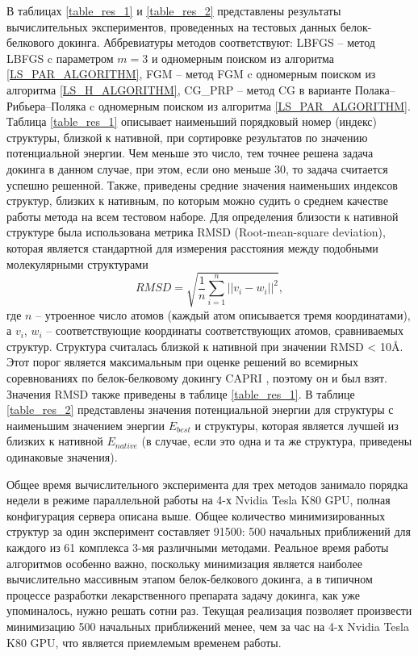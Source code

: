  В таблицах \ref{table_res_1} и \ref{table_res_2} представлены результаты вычислительных экспериментов, проведенных на тестовых данных белок-белкового докинга. Аббревиатуры методов соответствуют: LBFGS -- метод LBFGS c параметром $m = 3$ и одномерным поиском из алгоритма \ref{LS_PAR_ALGORITHM}, FGM -- метод FGM c одномерным поиском из алгоритма \ref{LS_H_ALGORITHM}, CG\_PRP -- метод CG в варианте Полака--Рибьера--Поляка c одномерным поиском из алгоритма \ref{LS_PAR_ALGORITHM}. Таблица \ref{table_res_1} описывает наименьший порядковый номер (индекс) структуры, близкой к нативной, при сортировке результатов по значению потенциальной энергии. Чем меньше это число, тем точнее решена задача докинга в данном случае, при этом, если оно меньше 30, то задача считается успешно решенной. Также, приведены средние значения наименьших индексов структур, близких к нативным, по которым можно судить о среднем качестве работы метода на всем тестовом наборе. Для определения близости к нативной структуре была использована метрика RMSD (Root-mean-square deviation), которая является стандартной для измерения расстояния между подобными молекулярными структурами 
  \[
  RMSD = \sqrt{\frac{1}{n}\sum_{i=1}^n ||v_i - w_i||^2},
  \]
  где $n$ -- утроенное число атомов (каждый атом описывается тремя координатами), а $v_i$, $w_i$ -- соответствующие координаты соответствующих атомов, сравниваемых структур.
  Структура считалась близкой к нативной при значении RMSD < 10Å. Этот порог является максимальным при оценке решений во всемирных соревнованиях по белок-белковому докингу CAPRI \cite{janin2002welcome}, поэтому он и был взят. Значения RMSD также приведены в таблице \ref{table_res_1}. В таблице \ref{table_res_2} представлены значения потенциальной энергии для структуры с наименьшим значением энергии $E_{best}$ и структуры, которая является лучшей из близких к нативной $E_{native}$ (в случае, если это одна и та же структура, приведены одинаковые значения). 

  Общее время вычислительного эксперимента для трех методов занимало порядка недели в режиме параллельной работы на 4-х Nvidia Tesla K80 GPU, полная конфигурация сервера описана выше. Общее количество минимизированных структур за один эксперимент составляет 91500: 500 начальных приближений для каждого из 61 комплекса 3-мя различными методами. Реальное время работы алгоритмов особенно важно, поскольку минимизация является наиболее вычислительно массивным этапом белок-белкового докинга, а в типичном процессе разработки лекарственного препарата задачу докинга, как уже упоминалось, нужно решать сотни раз. Текущая реализация позволяет произвести минимизацию 500 начальных приближений менее, чем за час на 4-х Nvidia Tesla K80 GPU, что является приемлемым временем работы.


